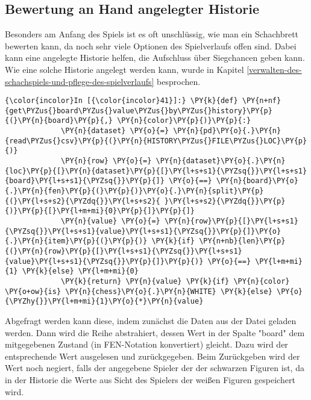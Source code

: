     \subsection{Bewertung an Hand angelegter
Historie}\label{bewertung-an-hand-angelegter-historie}

Besonders am Anfang des Spiels ist es oft unschlüssig, wie man ein
Schachbrett bewerten kann, da noch sehr viele Optionen des Spielverlaufs
offen sind. Dabei kann eine angelegte Historie helfen, die Aufschluss
über Siegchancen geben kann. Wie eine solche Historie angelegt werden
kann, wurde in Kapitel \ref{verwalten-des-schachspiels-und-pflege-des-spielverlaufs} besprochen.

    \begin{Verbatim}[commandchars=\\\{\}]
{\color{incolor}In [{\color{incolor}41}]:} \PY{k}{def} \PY{n+nf}{get\PYZus{}board\PYZus{}value\PYZus{}by\PYZus{}history}\PY{p}{(}\PY{n}{board}\PY{p}{,} \PY{n}{color}\PY{p}{)}\PY{p}{:}
             \PY{n}{dataset} \PY{o}{=} \PY{n}{pd}\PY{o}{.}\PY{n}{read\PYZus{}csv}\PY{p}{(}\PY{n}{HISTORY\PYZus{}FILE\PYZus{}LOC}\PY{p}{)}
             \PY{n}{row} \PY{o}{=} \PY{n}{dataset}\PY{o}{.}\PY{n}{loc}\PY{p}{[}\PY{n}{dataset}\PY{p}{[}\PY{l+s+s1}{\PYZsq{}}\PY{l+s+s1}{board}\PY{l+s+s1}{\PYZsq{}}\PY{p}{]} \PY{o}{==} \PY{n}{board}\PY{o}{.}\PY{n}{fen}\PY{p}{(}\PY{p}{)}\PY{o}{.}\PY{n}{split}\PY{p}{(}\PY{l+s+s2}{\PYZdq{}}\PY{l+s+s2}{ }\PY{l+s+s2}{\PYZdq{}}\PY{p}{)}\PY{p}{[}\PY{l+m+mi}{0}\PY{p}{]}\PY{p}{]}
             \PY{n}{value} \PY{o}{=} \PY{n}{row}\PY{p}{[}\PY{l+s+s1}{\PYZsq{}}\PY{l+s+s1}{value}\PY{l+s+s1}{\PYZsq{}}\PY{p}{]}\PY{o}{.}\PY{n}{item}\PY{p}{(}\PY{p}{)} \PY{k}{if} \PY{n+nb}{len}\PY{p}{(}\PY{n}{row}\PY{p}{[}\PY{l+s+s1}{\PYZsq{}}\PY{l+s+s1}{value}\PY{l+s+s1}{\PYZsq{}}\PY{p}{]}\PY{p}{)} \PY{o}{==} \PY{l+m+mi}{1} \PY{k}{else} \PY{l+m+mi}{0}
             \PY{k}{return} \PY{n}{value} \PY{k}{if} \PY{n}{color} \PY{o+ow}{is} \PY{n}{chess}\PY{o}{.}\PY{n}{WHITE} \PY{k}{else} \PY{o}{\PYZhy{}}\PY{l+m+mi}{1}\PY{o}{*}\PY{n}{value}
\end{Verbatim}

    Abgefragt werden kann diese, indem zunächst die Daten aus der Datei
geladen werden. Dann wird die Reihe abstrahiert, dessen Wert in der
Spalte "board" dem mitgegebenen Zustand (in FEN-Notation konvertiert)
gleicht. Dazu wird der entsprechende Wert ausgelesen und zurückgegeben.
Beim Zurückgeben wird der Wert noch negiert, falls der angegebene
Spieler der der schwarzen Figuren ist, da in der Historie die Werte aus
Sicht des Spielers der weißen Figuren gespeichert wird.

